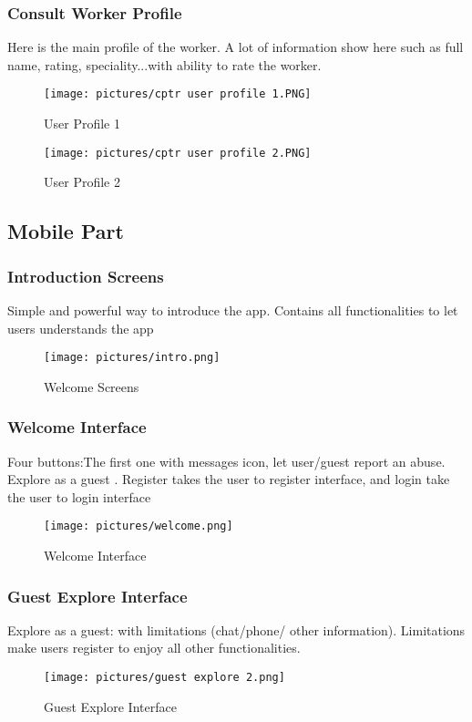 \documentclass[12pt]{report}
\begin{document}
\pagebreak
\subsubsection{Consult Worker Profile}
Here is the main profile of the worker. A lot of information show here such as full name, rating, speciality...with ability to rate the worker.
\begin{figure}[!htbp]
    \centering
    \texttt{[image: pictures/cptr user profile 1.PNG]}
    \caption{User Profile 1}
    \label{fig:19}
\end{figure}

\begin{figure}[!htbp]
    \centering
    \texttt{[image: pictures/cptr user profile 2.PNG]}
    \caption{User Profile 2}
    \label{fig:20}
\end{figure}





\subsection{Mobile Part}
\subsubsection{Introduction Screens}
Simple and powerful way to introduce the app.
Contains all functionalities to let users understands the app
\begin{figure}[!htbp]

        \centering
    \texttt{[image: pictures/intro.png]}
    \caption{Welcome Screens}
    \label{fig:intro}
\end{figure}
\pagebreak
\subsubsection{Welcome Interface}
Four buttons:The first one with messages icon, let user/guest report an abuse.
Explore as a guest .
Register takes the user to register interface, and login take the user to login interface
\begin{figure}[!htbp]

        \centering
    \texttt{[image: pictures/welcome.png]}
    \caption{Welcome Interface}
    \label{fig:welcome}
\end{figure}

\subsubsection{Guest Explore Interface}
Explore as a guest: with limitations (chat/phone/ other information).
Limitations make users register to enjoy all other functionalities.
\begin{figure}[!htbp]

        \centering
    \texttt{[image: pictures/guest explore 2.png]}
    \caption{Guest Explore Interface}
    \label{fig:guest_explore_interface}
\end{figure}
\end{document}
